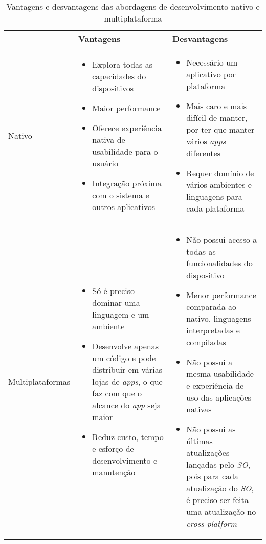\begin{table}[h]
	\centering
	{\renewcommand\arraystretch{1.25}
		\begin{tabular}{|l|l|l|} \hline
			& \multicolumn{1}{l|}{Vantagens} & \multicolumn{1}{l|}{Desvantagens}  \\ \hline\hline
			Nativo& 
			\multicolumn{1}{p{6cm}|}{\raggedright 
					\begin{itemize}
						\item Explora todas as capacidades do dispositivos
						\item Maior performance
						\item Oferece experiência nativa de usabilidade para o usuário
						\item Integração próxima com o sistema e outros aplicativos
					\end{itemize}
				} & 
			\multicolumn{1}{p{6cm}|}{\raggedright 
					\begin{itemize}
						\item Necessário um aplicativo por plataforma
						\item Mais caro e mais difícil de manter, por ter que manter vários \textit{apps} diferentes
						\item Requer domínio de vários ambientes e linguagens para cada plataforma
					\end{itemize}				
				}\\ \hline
			
			Multiplataformas& 
			\multicolumn{1}{p{6cm}|}{\raggedright 
					\begin{itemize}		
						\item Só é preciso dominar uma linguagem e um ambiente
						\item Desenvolve apenas um código e pode distribuir em várias lojas de \textit{apps}, o que faz com que o alcance do \textit{app} seja maior
						\item Reduz custo, tempo e esforço de desenvolvimento e manutenção
					\end{itemize}		
				} & 
			\multicolumn{1}{p{6cm}|}{\raggedright 
					\begin{itemize}		
						\item Não possui acesso a todas as funcionalidades do dispositivo
						\item Menor performance comparada ao nativo, linguagens interpretadas e compiladas
						\item Não possui a mesma usabilidade e experiência de uso das aplicações nativas
						\item Não possui as últimas atualizações lançadas pelo \textit{SO}, pois para cada atualização do \textit{SO}, é preciso ser feita uma atualização no \textit{cross-platform}											
					\end{itemize}												
				}\\ \hline
		\end{tabular}}
	\caption{Vantagens e desvantagens das abordagens de desenvolvimento nativo e multiplataforma }
	\label{tab:vantxdesva}
\end{table}